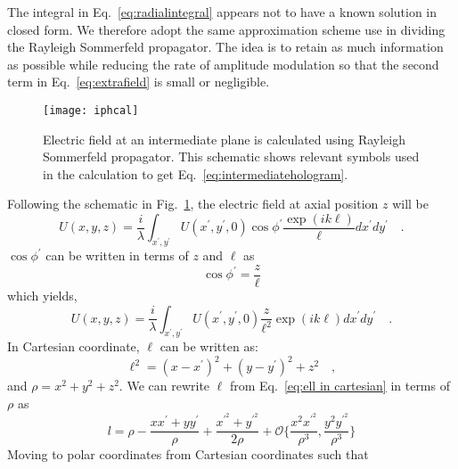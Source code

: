 The integral in Eq.~\eqref{eq:radialintegral} appears not to have a known solution in closed form. We therefore adopt the same approximation scheme use in dividing the Rayleigh Sommerfeld propagator.
The idea is to retain as much information
as possible while reducing the rate of amplitude modulation so that the second term 
in Eq.~\eqref{eq:extrafield} is small or negligible.

\begin{figure}[t!]
  \centering
  \texttt{[image: iphcal]}
  \caption{Electric field at an intermediate plane is calculated using Rayleigh Sommerfeld propagator. This schematic shows relevant symbols used in the calculation to get Eq.~\eqref{eq:intermediatehologram}.}
  \label{fig:intermediate field schema}
\end{figure}
Following the schematic in Fig.~\ref{fig:intermediate field schema}, 
the electric field at axial position $z$ will be
\begin{equation}
\label{eq:intermediate field a}
U(x,y,z) = \frac{i}{\lambda}\int _{x^{\prime},y^{\prime}}U(x^{\prime},y^{\prime},0)
					\cos \phi ^{\prime} \frac{\exp 
					\left( ik\ell \right)}{\ell}dx^{\prime}dy^{\prime} \quad .
\end{equation}
$\cos\phi ^{\prime}$ can be written in terms of $z$ and $\ell$ as 
\begin{equation}
\cos \phi ^{\prime} = \frac{z}{\ell}
\end{equation}
which yields,
\begin{equation}
\label{eq:intermediate field b}
U(x,y,z) = \frac{i}{\lambda}\int _{x^{\prime},y^{\prime}}U(x^{\prime},y^{\prime},0)
					\frac{z}{\ell ^2} \exp 
					\left( ik\ell \right)dx^{\prime}dy^{\prime} \quad .
\end{equation}
In Cartesian coordinate, $\ell$ can be written as:
\begin{equation}
\label{eq:ell in cartesian}
\ell ^2 = (x-x^{\prime})^{2} + (y-y^{\prime})^{2} + z^{2} \quad ,
\end{equation}
and $\rho = x^2 + y^2 + z^2$. We can rewrite $\ell$ from 
Eq.~\eqref{eq:ell in cartesian} in terms of $\rho$ as 
\begin{equation}
\label{eq:ell in r}
l = \rho - \frac{xx^{\prime}+yy^{\prime}}{\rho} + \frac{x^{\prime^{2}} + y^{\prime^{2}}}{2\rho}
			+ \mathcal{O}\lbrace \frac{x^2x^{\prime ^{2}}}{\rho ^3},\frac{y^2y^{\prime ^{2}}}{\rho ^3} \rbrace
\end{equation}
Moving to polar coordinates from Cartesian coordinates such that
